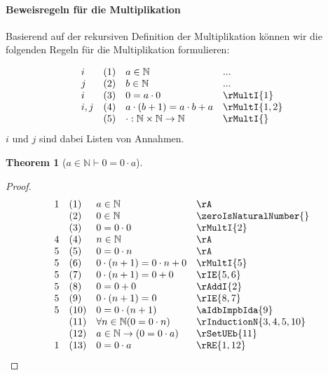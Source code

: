 \documentclass{book}
\theoremstyle{plain}
\newtheorem{theorem}{Theorem}
\theoremstyle{remark}
\theoremstyle{definition}
\begin{document}
\paragraph{Beweisregeln für die Multiplikation}
\label{rule:rMultI} 
Basierend auf der rekursiven Definition der Multiplikation können wir die folgenden Regeln für die Multiplikation formulieren:

\[
\begin{array}{llll}
	i & (1) & a \in \mathbb{N} & ... \\
	j & (2) & b \in \mathbb{N} & ... \\                                    
        i & (3) & 0=a \cdot 0  & \rMultI{1} \\
	i,j & (4) & a \cdot (b+1) = a \cdot b + a & \rMultI{1,2} \\
         & (5) & \cdot:\mathbb{N}\times\mathbb{N}\rightarrow\mathbb{N} & \rMultI{} \\
\end{array}
\]
\(i\) und \(j\) sind dabei Listen von Annahmen.

\label{aInNaturalImpZeroEqualsZeroMulta}
\begin{theorem}[\(a\in\mathbb{N}\vdash 0=0\cdot a\)]
\end{theorem}
\begin{proof}
        \[
	\begin{array}{llll}
            1       &  (1) & a\in\mathbb{N} & \rA \\
                    &  (2) & 0\in\mathbb{N} & \zeroIsNaturalNumber{} \\
                    &  (3) & 0=0\cdot 0 & \rMultI{2} \\
            4       &  (4) & n\in\mathbb{N} & \rA \\
            5       &  (5) & 0=0\cdot n & \rA \\
            5       &  (6) & 0\cdot (n+1)=0\cdot n+0 & \rMultI{5} \\
            5       &  (7) & 0\cdot (n+1)=0+0 & \rIE{5,6} \\
            5       &  (8) & 0=0+0 & \rAddI{2} \\
            5       &  (9) & 0\cdot (n+1)=0 & \rIE{8,7} \\
            5       &  (10) & 0=0\cdot (n+1) & \aIdbImpbIda{9} \\
                    &  (11) & \forall n\in\mathbb{N}(0=0\cdot n) & \rInductionN{3,4,5,10} \\
                    &  (12) & a\in\mathbb{N}\rightarrow (0=0\cdot a) & \rSetUEb{11} \\
            1       &  (13) & 0=0\cdot a & \rRE{1,12} \\
	\end{array}
	\]
\end{proof}
\end{document}

